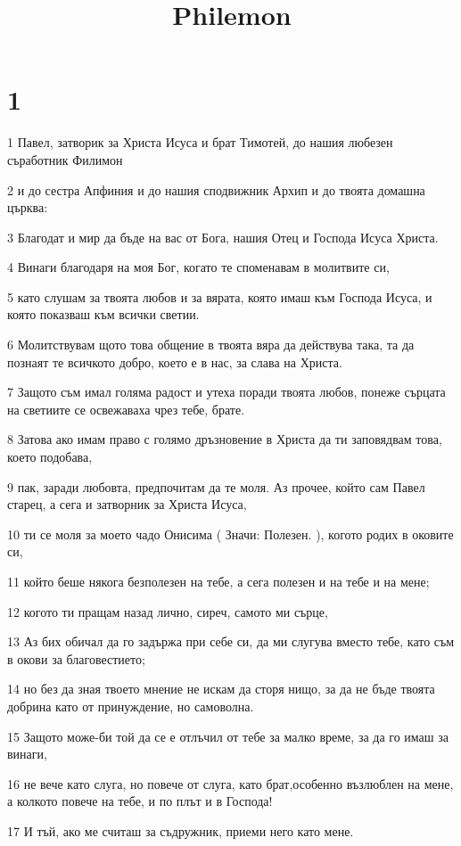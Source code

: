 

\title{Philemon}


\chapter{1}

\par 1 Павел, затворик за Христа Исуса и брат Тимотей, до нашия любезен съработник Филимон
\par 2 и до сестра Апфиния и до нашия сподвижник Архип и до твоята домашна църква:
\par 3 Благодат и мир да бъде на вас от Бога, нашия Отец и Господа Исуса Христа.
\par 4 Винаги благодаря на моя Бог, когато те споменавам в молитвите си,
\par 5 като слушам за твоята любов и за вярата, която имаш към Господа Исуса, и която показваш към всички светии.
\par 6 Молитствувам щото това общение в твоята вяра да действува така, та да познаят те всичкото добро, което е в нас, за слава на Христа.
\par 7 Защото съм имал голяма радост и утеха поради твоята любов, понеже сърцата на светиите се освежаваха чрез тебе, брате.
\par 8 Затова ако имам право с голямо дръзновение в Христа да ти заповядвам това, което подобава,
\par 9 пак, заради любовта, предпочитам да те моля. Аз прочее, който сам Павел старец, а сега и затворник за Христа Исуса,
\par 10 ти се моля за моето чадо Онисима ( Значи: Полезен. ), когото родих в оковите си,
\par 11 който беше някога безполезен на тебе, а сега полезен и на тебе и на мене;
\par 12 когото ти пращам назад лично, сиреч, самото ми сърце,
\par 13 Аз бих обичал да го задържа при себе си, да ми слугува вместо тебе, като съм в окови за благовестието;
\par 14 но без да зная твоето мнение не искам да сторя нищо, за да не бъде твоята добрина като от принуждение, но самоволна.
\par 15 Защото може-би той да се е отлъчил от тебе за малко време, за да го имаш за винаги,
\par 16 не вече като слуга, но повече от слуга, като брат,особенно възлюблен на мене, а колкото повече на тебе, и по плът и в Господа!
\par 17 И тъй, ако ме считаш за съдружник, приеми него като мене.
